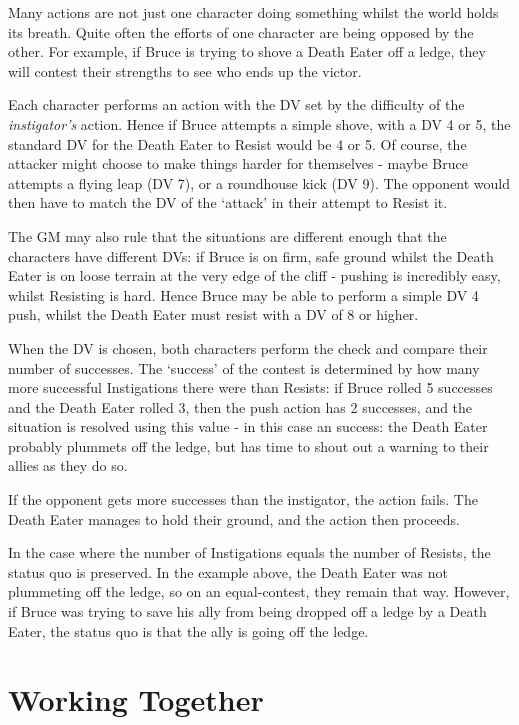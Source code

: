 Many actions are not just one character doing something whilst the world holds its breath. Quite often the efforts of one character are being opposed by the other. For example, if Bruce is trying to shove a Death Eater off a ledge, they will contest their strengths to see who ends up the victor. 

Each character performs an action with the DV set by the difficulty of the {\it instigator's} action. Hence if Bruce attempts a simple shove, with a DV 4 or 5, the standard DV for the Death Eater to Resist would be 4 or 5. Of course, the attacker might choose to make things harder for themselves - maybe Bruce attempts a flying leap (DV 7), or a roundhouse kick (DV 9). The opponent would then have to match the DV of the `attack' in their attempt to Resist it. 

The GM may also rule that the situations are different enough that the characters have different DVs: if Bruce is on firm, safe ground whilst the Death Eater is on loose terrain at the very edge of the cliff - pushing is incredibly easy, whilst Resisting is hard. Hence Bruce may be able to perform a simple DV 4 push, whilst the Death Eater must resist with a DV of 8 or higher. 

When the DV is chosen, both characters perform the check and compare their number of successes. The `success' of the contest is determined by how many more successful Instigations there were than Resists: if Bruce rolled 5 successes and the Death Eater rolled 3, then the push action has 2 successes, and the situation is resolved using this value - in this case an  success: the Death Eater probably plummets off the ledge, but has time to shout out a warning to their allies as they do so.

If the opponent gets more successes than the instigator, the action fails. The Death Eater manages to hold their ground, and the action then proceeds. 

In the case where the number of Instigations equals the number of Resists, the status quo is preserved. In the example above, the Death Eater was not plummeting off the ledge, so on an equal-contest, they remain that way. However, if Bruce was trying to save his ally from being dropped off a ledge by a Death Eater, the status quo is that the ally is going off the ledge. 

\section{Working Together}

